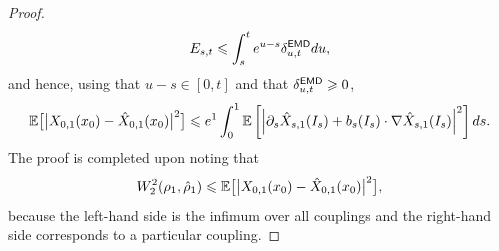 \begin{proof}
\begin{equation}
		E_{s, t} \leqslant \int_s^t e^{u-s}\delta_{u, t}^{\mathsf{EMD}}du,
	\end{equation}
	and hence, using that $u-s \in [0, t]$ and that $\delta_{u, t}^{\mathsf{EMD}} \geqslant 0$,
	\begin{equation}
		\mathbb{E}\big[\big|X_{0, 1}(x_0) - \hat{X}_{0, 1}(x_0)\big|^2\big] \leqslant e^1\int_0^1 \mathbb{E}\left[\left|\partial_s \hat{X}_{s, 1}(I_s) + b_s(I_s) \cdot \nabla \hat{X}_{s, 1}(I_s)\right|^2\right]ds.
	\end{equation}
	The proof is completed upon noting that
	\begin{equation}
		W_2^2(\rho_1, \hat{\rho}_1) \leqslant \mathbb{E}\big[\big|X_{0, 1}(x_0) - \hat{X}_{0, 1}(x_0)\big|^2\big],
	\end{equation}
	because the left-hand side is the infimum over all couplings and the right-hand side corresponds to a particular coupling.
\end{proof}



